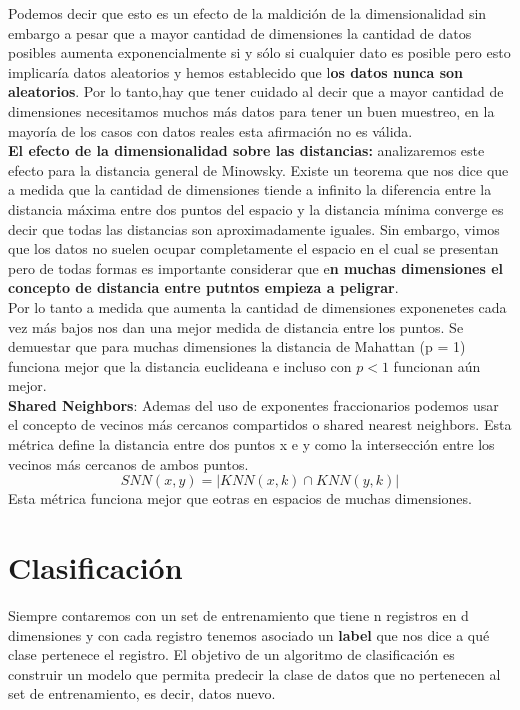 \documentclass[titlepage,a4paper]{article}
\begin{document}
Podemos decir que esto es un efecto de la maldición de la dimensionalidad sin embargo a pesar que a mayor cantidad de dimensiones la cantidad de datos posibles aumenta exponencialmente si y sólo si cualquier dato  es posible pero esto implicaría datos aleatorios y hemos establecido que l\textbf{os datos nunca son aleatorios}. Por lo tanto,hay que tener cuidado al decir que a mayor cantidad de dimensiones  necesitamos muchos más datos para tener un buen muestreo, en la mayoría de los casos con datos reales esta afirmación no es válida. \\

\textbf{El efecto de la dimensionalidad sobre las distancias:} analizaremos este efecto para la distancia general de Minowsky. Existe un teorema que nos dice que a medida que la cantidad de dimensiones tiende a infinito la diferencia entre la distancia máxima entre dos puntos del espacio y la distancia mínima converge es decir que todas las distancias son aproximadamente iguales. Sin embargo, vimos que los datos no suelen ocupar completamente el espacio en el cual se presentan pero de todas formas es importante considerar que e\textbf{n muchas dimensiones el concepto de distancia entre putntos empieza a peligrar}. \\

Por lo tanto a medida que aumenta la cantidad de dimensiones exponenetes cada vez más bajos nos dan una mejor medida de distancia entre los puntos. Se demuestar que para muchas dimensiones la distancia de Mahattan (p = 1) funciona mejor que la distancia euclideana e incluso con  $p < 1$ funcionan aún mejor. \\

\textbf{Shared Neighbors}: Ademas del uso de exponentes fraccionarios  podemos usar el concepto de vecinos más cercanos compartidos o shared nearest neighbors. Esta métrica define la distancia entre dos puntos x e y como la intersección entre los vecinos más cercanos de ambos puntos. $$SNN(x,y) = |KNN(x,k)\cap KNN(y,k)|$$ Esta métrica funciona mejor que eotras en espacios de muchas dimensiones. 
 
 
\section*{Clasificación}
Siempre contaremos con un set de entrenamiento que tiene n registros en d dimensiones y con cada registro tenemos asociado un \textbf{label} que nos dice a qué clase pertenece el registro. El objetivo de un algoritmo de clasificación es construir un modelo que  permita predecir la clase de datos que no pertenecen al set de entrenamiento, es decir, datos nuevo. \\
\end{document}
